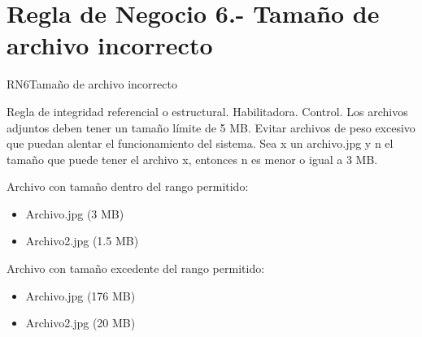 \section{Regla de Negocio 6.- Tamaño de archivo incorrecto}
\begin{BussinesRule}{RN6}{Tamaño de archivo incorrecto}

	\BRitem[Tipo:] Regla de integridad referencial o estructural. 
	\BRitem[Clase:] Habilitadora. 
	\BRitem[Nivel:] Control. %
	\BRitem[Descripción:]	Los archivos adjuntos deben tener un tamaño límite de 5 MB. 
	\BRitem[Motivación:] Evitar archivos de peso excesivo que puedan alentar el funcionamiento del sistema.
	\BRitem[Sentencia:]
	    Sea x un archivo.jpg y n el tamaño que puede tener el archivo x, entonces n es menor o igual a 3 MB.

	 Archivo con tamaño dentro del rango permitido:		
        \begin{itemize}
        	\item Archivo.jpg (3 MB)
			\item Archivo2.jpg (1.5 MB)
        \end{itemize}
	
	 Archivo con tamaño excedente del rango permitido:
		\begin{itemize}
        	\item Archivo.jpg (176 MB)
			\item Archivo2.jpg (20 MB)
        \end{itemize}
\end{BussinesRule}

